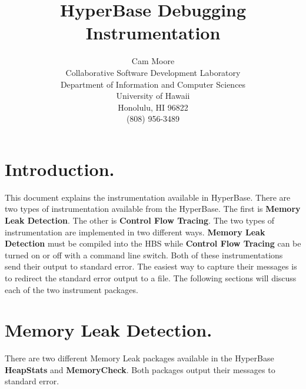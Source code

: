 




\title{HyperBase Debugging Instrumentation} 
\author {Cam Moore\\
Collaborative Software Development Laboratory\\ 
Department of Information and Computer Sciences\\
University of Hawaii\\
Honolulu, HI 96822\\
(808) 956-3489}

\maketitle

\tableofcontents

\section{Introduction.}
This document explains the instrumentation available in HyperBase.  There
are two types of instrumentation available from the HyperBase.  The first
is {\bf Memory Leak Detection}.  The other is {\bf Control Flow Tracing}.
The two types of instrumentation are implemented in two different ways.
{\bf Memory Leak Detection} must be compiled into the HBS while {\bf
Control Flow Tracing} can be turned on or off with a command line switch.
Both of these instrumentations send their output to standard error.  The
easiest way to capture their messages is to redirect the standard error
output to a file.
The following sections will discuss each of the two instrument packages.
\section{Memory Leak Detection.}
There are two different Memory Leak packages available in the HyperBase
{\bf HeapStats} and {\bf MemoryCheck}.  Both packages output their messages
to standard error.
